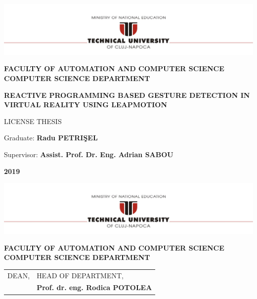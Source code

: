 \documentclass[12pt,a4paper,twoside]{report}
\renewcommand{\thesisauthor}{Radu PETRIŞEL}    %
\renewcommand{\thesisyear}{2019}      %
\renewcommand{\thesistitle}{REACTIVE PROGRAMMING BASED GESTURE DETECTION IN VIRTUAL REALITY USING LEAPMOTION}
\renewcommand{\thesissupervisor}{Assist. Prof. Dr. Eng. Adrian SABOU}
\newcommand{\department}{\bf FACULTY OF AUTOMATION AND COMPUTER SCIENCE\\
COMPUTER SCIENCE DEPARTMENT}
\newcommand{\thesis}{LICENSE THESIS}
\newcommand{\utcnlogo}{\includegraphics[width=15cm]{img/tucn.jpg}}
\begin{document}

\newenvironment{definition}[1][Defini\c{t}ie.]{\begin{trivlist}
\item[\hskip \labelsep {\bfseries #1}]}{\end{trivlist}}


\setcounter{secnumdepth}{3}

\setcounter{page}{1}

\begin{center}
\utcnlogo

\department

\vspace{4cm}

{\bf \thesistitle} %

\vspace{1.5cm}

\thesis
\vspace{5.75cm}

Graduate: {\bf \thesisauthor{}} 

Supervisor: {\bf \thesissupervisor{}}

\vspace{3cm}
{\bf \thesisyear}
\end{center}

\thispagestyle{empty}
\newpage

\begin{center}
\utcnlogo

\department

\end{center}
\vspace{0.5cm}

\begin{tabular}{p{7cm}p{8cm}}
 \hspace{-1cm}DEAN, & HEAD OF DEPARTMENT,\\
 \hspace{-1cm}{\bf Prof. dr. eng. Liviu MICLEA} & {\bf Prof. dr. eng. Rodica POTOLEA}\\  
\end{tabular}
 
\vspace{2cm}
\end{document}
